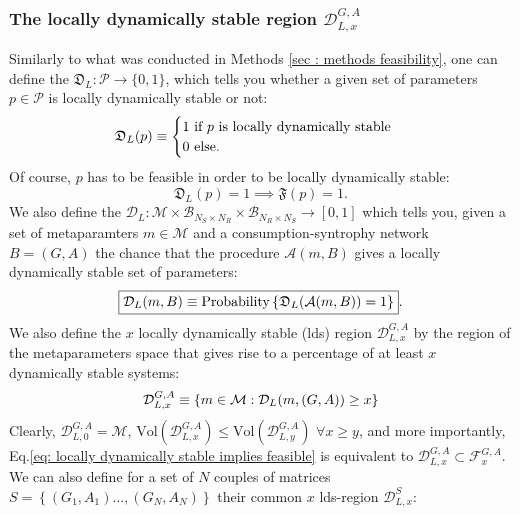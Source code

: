 \documentclass[12pt, titlepage]{report}
\begin{document}
\subsubsection{The locally dynamically stable region $\mathcal{D}^{G,A}_{L,x}$} \label{sec: dynamical stability methods locally dynamically stable region}
Similarly to what was conducted in Methods \ref{sec : methods feasibility}, one can define the  $\mathfrak{D}_L: \mathcal{P} \rightarrow \{
0,1\}$, which tells you whether a given set of parameters $p \in \mathcal{P}$ is locally dynamically stable or not:
\begin{equation}
\mathfrak{D}_L(p)\equiv\begin{cases}
1 \text{ if } p \text{ is locally dynamically stable} \\
0 \text{ else.}
\end{cases}
\end{equation}
Of course, $p$ has to be feasible in order to be locally dynamically stable:
\begin{equation}
\mathfrak{D}_L(p)=1 \implies \mathfrak{F}(p)=1. \label{eq: locally dynamically stable implies feasible}
\end{equation}
We also define the  $\mathcal{D}_L: \mathcal{M} \times \mathcal{B}_{N_S \times N_R} \times \mathcal{B}_{N_R \times N_S} \rightarrow [0,1]$ which tells you, given a set of metaparamters $m \in \mathcal{M}$ and a consumption-syntrophy network $B=(G,A)$ the chance that the procedure $\mathcal{A}(m,B)$ gives a locally dynamically stable set of parameters:
\begin{equation}
\boxed{\mathcal{D}_L(m, B)\equiv\text{Probability}\left\{\mathfrak{D}_L(\mathcal{A}(m, B))=1\right\}}. \label{eq : dyn stab methods dynamical stability function}
\end{equation}
We also define the $x$ locally dynamically stable (lds) region $\mathcal{D}_{L,x}^{G,A}$ by the region of the metaparameters space that gives rise to a percentage of at least $x$ dynamically stable systems:
\begin{equation}
\mathcal{D}_{L,x}^{G,A} \equiv \left\{m \in \mathcal{M}: \mathcal{D}_L(m, (G,A)) \geq x \right\}
\end{equation}
Clearly, $\mathcal{D}_{L,0}^{G,A}=\mathcal{M}$, $\text{Vol}\left(\mathcal{D}_{L,x}^{G,A}\right) \leq \text{Vol}\left(\mathcal{D}_{L,y}^{G,A}\right)$ $\forall x \geq y$, and more importantly, Eq.\eqref{eq: locally dynamically stable implies feasible} is equivalent to $\mathcal{D}_{L,x}^{G,A} \subset \mathcal{F}_x^{G,A}$. We can also define for a set of $N$ couples of matrices $S=\left\{(G_1, A_1) \dots, (G_N, A_N)\right\}$ their common $x$ lds-region $\mathcal{D}_{L,x}^S$:
\end{document}
